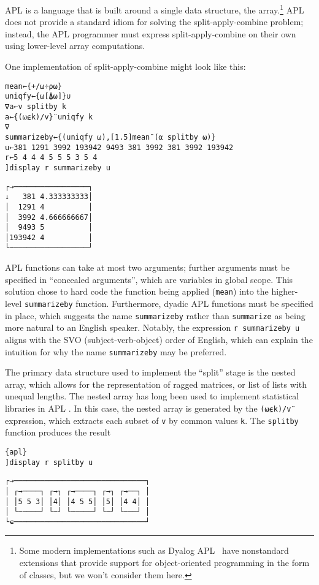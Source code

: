 \documentclass[11pt]{asaproc}
\begin{document}
APL is a language that is built around a single data structure, the
array.\footnote{Some modern implementations such as Dyalog APL~\citep{dyalog15}
have nonstandard extensions that provide support for object-oriented
programming in the form of classes, but we won't consider them here.} APL does
not provide a standard idiom for solving the split-apply-combine problem;
instead, the APL programmer must express split-apply-combine on their own using
lower-level array computations.

One implementation of split-apply-combine might look like this:

\begin{lstlisting}[language=apl]
mean←{+/⍵÷⍴⍵}
uniqfy←{⍵[⍋⍵]}∪
∇a←v splitby k
a←{(⍵⍷k)/v}¨uniqfy k
∇
summarizeby←{(uniqfy ⍵),[1.5]mean¨(⍺ splitby ⍵)}
u←381 1291 3992 193942 9493 381 3992 381 3992 193942
r←5 4 4 4 5 5 5 3 5 4
]display r summarizeby u
\end{lstlisting}
\begin{verbatim}
┌→─────────────────┐
↓   381 4.333333333│
│  1291 4          │
│  3992 4.666666667│
│  9493 5          │
│193942 4          │
└~─────────────────┘
\end{verbatim}

APL functions can take at most two arguments; further arguments must be
specified in ``concealed arguments'', which are variables in global scope.
This solution chose to hard code the function being applied (\lstinline|mean|)
into the higher-level \lstinline|summarizeby| function. Furthermore, dyadic APL
functions must be specified in place, which suggests the name
\lstinline|summarizeby| rather than \lstinline|summarize| as being more natural
to an English speaker. Notably, the expression \lstinline|r summarizeby u|
aligns with the SVO (subject-verb-object) order of English, which can explain
the intuition for why the name \lstinline|summarizeby| may be preferred.

The primary data structure used to implement the ``split'' stage is the nested
array, which allows for the representation of ragged matrices, or list of lists
with unequal lengths. The nested array has long been used to implement
statistical libraries in APL \citep{Anscombe1981,Friendly1994}. In this case,
the nested array is generated by the \lstinline|(⍵⍷k)/v¨|
expression, which extracts each subset of \lstinline|v| by common values
\lstinline|k|. The \lstinline|splitby| function produces the result

\begin{lstlisting}{apl}
]display r splitby u
\end{lstlisting}
\begin{verbatim}
┌→──────────────────────────────┐
│ ┌→────┐ ┌→┐ ┌→────┐ ┌→┐ ┌→──┐ │
│ │5 5 3│ │4│ │4 5 5│ │5│ │4 4│ │
│ └~────┘ └~┘ └~────┘ └~┘ └~──┘ │
└∊──────────────────────────────┘
\end{verbatim}
\end{document}
